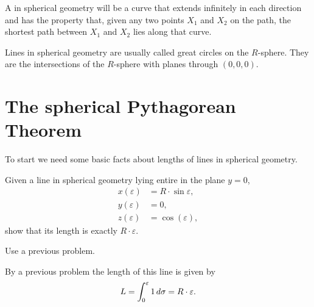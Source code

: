 \documentclass{ximera}
\begin{document}
\begin{definition}
A  in spherical geometry will be a curve that extends
infinitely in each direction and has the property that, given any two
points $X_{1}$ and $X_{2}$ on the path, the shortest path between
$X_{1}$ and $X_{2}$ lies along that curve.

Lines in spherical geometry are usually called great circles on the
$R$-sphere. They are the intersections of the $R$-sphere with planes
through $(0,0,0)$.
\end{definition}


\section{The spherical Pythagorean Theorem}

To start we need some basic facts about lengths of lines in spherical
geometry.

\begin{problem}
  Given a line in spherical geometry lying entire in the plane $y=0$,
  \begin{align*}
    x(\varepsilon) &= R\cdot\sin\varepsilon,\\
    y(\varepsilon) &= 0,\\
    z(\varepsilon) &= \cos(\varepsilon),
  \end{align*}
  show that its length is exactly $R\cdot \varepsilon$.
  \begin{hint}
    Use a previous problem.
  \end{hint}
  \begin{freeResponse}
    By a previous problem the length of this line is given by
    \[
    L=\int_{0}^{\varepsilon} 1 \,d\sigma = R\cdot\varepsilon.
    \]
  \end{freeResponse}
\end{problem}
\end{document}
